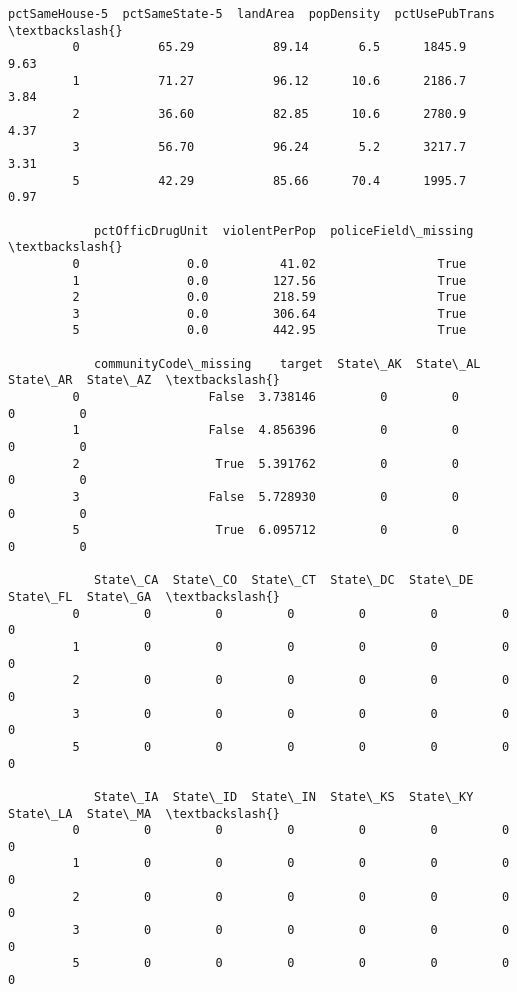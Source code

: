 \documentclass[11pt]{llncs}
\begin{document}
\begin{Verbatim}[commandchars=\\\{\}]
            pctSameHouse-5  pctSameState-5  landArea  popDensity  pctUsePubTrans  \textbackslash{}
         0           65.29           89.14       6.5      1845.9            9.63   
         1           71.27           96.12      10.6      2186.7            3.84   
         2           36.60           82.85      10.6      2780.9            4.37   
         3           56.70           96.24       5.2      3217.7            3.31   
         5           42.29           85.66      70.4      1995.7            0.97   
         
            pctOfficDrugUnit  violentPerPop  policeField\_missing  \textbackslash{}
         0               0.0          41.02                 True   
         1               0.0         127.56                 True   
         2               0.0         218.59                 True   
         3               0.0         306.64                 True   
         5               0.0         442.95                 True   
         
            communityCode\_missing    target  State\_AK  State\_AL  State\_AR  State\_AZ  \textbackslash{}
         0                  False  3.738146         0         0         0         0   
         1                  False  4.856396         0         0         0         0   
         2                   True  5.391762         0         0         0         0   
         3                  False  5.728930         0         0         0         0   
         5                   True  6.095712         0         0         0         0   
         
            State\_CA  State\_CO  State\_CT  State\_DC  State\_DE  State\_FL  State\_GA  \textbackslash{}
         0         0         0         0         0         0         0         0   
         1         0         0         0         0         0         0         0   
         2         0         0         0         0         0         0         0   
         3         0         0         0         0         0         0         0   
         5         0         0         0         0         0         0         0   
         
            State\_IA  State\_ID  State\_IN  State\_KS  State\_KY  State\_LA  State\_MA  \textbackslash{}
         0         0         0         0         0         0         0         0   
         1         0         0         0         0         0         0         0   
         2         0         0         0         0         0         0         0   
         3         0         0         0         0         0         0         0   
         5         0         0         0         0         0         0         0   
         

\end{Verbatim}
\end{document}

